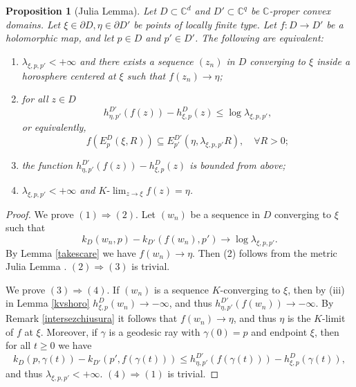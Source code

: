 \documentclass[11pt, reqno]{amsart}
\numberwithin{equation}{section}
\newtheorem{proposition}[theorem]{Proposition}
\theoremstyle{definition}
\newcommand{\C}{\mathbb{C}}
\begin{document}
{{{		
		\begin{proposition}[Julia Lemma]\label{JuliaLemma}
			Let $D\subset\C^d$ and $D'\subset\C^{q}$ be  $\C$-proper convex domains. Let $\xi\in\partial D,\eta\in \partial D'$ be points of locally finite type. Let $f\colon D\to D'$ be a holomorphic map, and let $p\in D$ and $p'\in D'$. The following are equivalent:
			\begin{enumerate}
				\item  $\lambda_{\xi,p,p'}<+\infty$ and  there exists a sequence  $(z_n)$ in $D$ converging to $\xi$ inside  a horosphere centered at $\xi$ such that $f(z_n)\to \eta$;
				\item  for all $z\in D$ $$h^{D'}_{\eta,p'}(f(z))-h^D_{\xi,p}(z)\leq \log \lambda_{\xi,p,p'},$$ or equivalently, 
				$$f(E^D_{p}(\xi,R))\subseteq E^{D'}_{p'}(\eta,\lambda_{\xi,p,p'}R),\quad \forall R>0;$$
				\item 
				the function $h^{D'}_{\eta,p'}(f(z))-h^D_{\xi,p}(z)$ is bounded from above;
				\item $\lambda_{\xi,p,p'}<+\infty$  and $K\textrm{-}\lim_{z\to\xi}f(z)=\eta$.
			\end{enumerate}
		\end{proposition}
		
		
		\begin{proof}
			We prove $(1)\Rightarrow(2)$.
			Let $(w_n)$ be a sequence in $D$ converging to $\xi$ such that $$k_D(w_n,p)-k_{D'}(f(w_n),p')\to \log\lambda_{\xi,p,p'}. $$
			By Lemma \ref{takescare} we have $f(w_n)\to\eta$. Then (2) follows from the metric Julia  Lemma \cite[Lemma 6.14]{AFGG}.
			$(2)\Rightarrow (3)$ is trivial.
			
			We prove $(3)\Rightarrow (4)$.
			If $(w_n)$ is a sequence $K$-converging to $\xi$,  then by (iii) in Lemma \ref{kvshoro}  $h^D_{\xi,p}(w_n)\to-\infty$, and thus
			$h^{D'}_{\eta,p'}(f(w_n))\to-\infty.$ By Remark \ref{intersezchiusura} it follows that $f(w_n)\to\eta$, and thus  $\eta$ is the $K$-limit of $f$ at $\xi$. 
			Moreover, if  $\gamma$ is a geodesic ray with $\gamma(0)=p$ and endpoint $\xi$, then for all $t\geq 0$ we have
			\begin{equation}\label{disuginteress}k_D(p,\gamma(t))-k_{D'}(p',f(\gamma(t)))\leq h^{D'}_{\eta,p'}(f(\gamma(t)))-h^D_{\xi,p}(\gamma(t)), 
			\end{equation}
			and thus $\lambda_{\xi,p,p'}<+\infty.$ $(4)\Rightarrow(1)$ is trivial.
			
			
			
		\end{proof}
		
}}}
\end{document}
